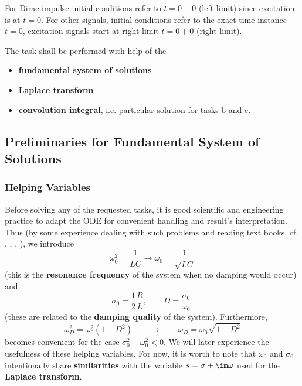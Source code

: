 For Dirac impulse initial conditions refer to $t=0-0$ (left limit) since excitation is at $t=0$.
For other signals, initial conditions refer to the exact time instance $t=0$,
excitation signals start at right limit $t=0+0$ (right limit).
%

The task shall be performed with help of the
\begin{itemize}
\item \textbf{fundamental system of solutions}
\item \textbf{Laplace transform}
\item \textbf{convolution integral}, i.e. particular solution for tasks b and e.
\end{itemize}


\newpage
\subsection{Preliminaries for Fundamental System of Solutions}



\subsubsection{Helping Variables}
Before solving any of the requested tasks, it is good scientific and engineering
practice to adapt the ODE for convenient handling and result's interpretation.
Thus (by some experience dealing with such problems and reading text books, cf.
\cite{LangeSigSys1}, \cite{Goeldner1987},  \cite{Oppenheim1997}, \cite{Strang2014}),
we introduce
\begin{equation}
\omega_0^2 = \frac{1}{L C} \rightarrow \omega_0 = \frac{1}{\sqrt{L C}}
\end{equation}
(this is the \textbf{resonance frequency} of the system when no damping would occur)
and
\begin{equation}
\sigma_0 = \frac{1}{2}\frac{R}{L},
\qquad
D = \frac{\sigma_0}{\omega_0}.
\end{equation}
(these are related to the \textbf{damping quality} of the system).
%
Furthermore,
\begin{equation}
\omega_D^2 = \omega_0^2 (1-D^2) \qquad \rightarrow \qquad \omega_D = \omega_0
\sqrt{1-D^2}
\end{equation}
becomes convenient for the case $\sigma_0^2 - \omega_0^2 < 0$.
We will later experience the usefulness of these helping variables.
For now, it is worth to note that $\omega_0$ and $\sigma_0$ intentionally share
\textbf{similarities} with the variable $s=\sigma + \im \omega$ used for the
\textbf{Laplace transform}.

